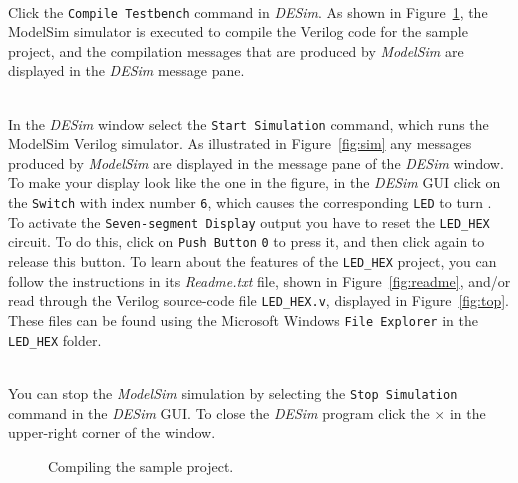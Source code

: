 \documentclass[epsfig,10pt,fullpage]{article} \addtolength{\textwidth}{1.5in}
\newcommand{\red}[1]{{\color{red}\sf{#1}}}
\begin{document}
~\\
\noindent
Click the \texttt{Compile Testbench} command in {\it DESim}. As shown in 
Figure~\ref{fig:compile}, the ModelSim simulator is executed to compile the Verilog
code for the sample project, and the compilation messages that are produced by 
{\it ModelSim} are displayed in the {\it DESim} message pane.

~\\
\noindent
In the {\it DESim} window select the \texttt{Start Simulation} command, which runs the
ModelSim Verilog simulator. As illustrated in Figure~\ref{fig:sim} any messages produced
by {\it ModelSim} are displayed in the message pane of the {\it DESim} window. To make your
display look like the one in the figure, in the {\it DESim} GUI click on 
the \texttt{Switch} with index number
\texttt{6}, which causes the corresponding \texttt{LED} to turn \red{red}. To activate the
\texttt{Seven-segment Display} output you have to reset the \texttt{LED\_HEX} circuit. To
do this, click on \texttt{Push Button} \texttt{0} to press it, and then click again to
release this button. 
To learn about the features of the \texttt{LED\_HEX} project, you can follow 
the instructions in its {\it Readme.txt} file, shown in Figure~\ref{fig:readme}, and/or 
read through the Verilog source-code file \texttt{LED\_HEX.v}, displayed in 
Figure~\ref{fig:top}. These files can be found
using the Microsoft Windows \texttt{File Explorer} in the \texttt{LED\_HEX} folder.

~\\
\noindent
You can stop the {\it ModelSim} simulation by selecting the \texttt{Stop Simulation}
command in the {\it DESim} GUI. To close the {\it DESim} program click the $\times$ in 
the upper-right corner of the window.    

\begin{figure}[h]
	\begin{center}
        \setlength{\fboxsep}{0pt}
	\end{center}
          \caption{Compiling the sample project.}
	\label{fig:compile}
\end{figure}
\end{document}
